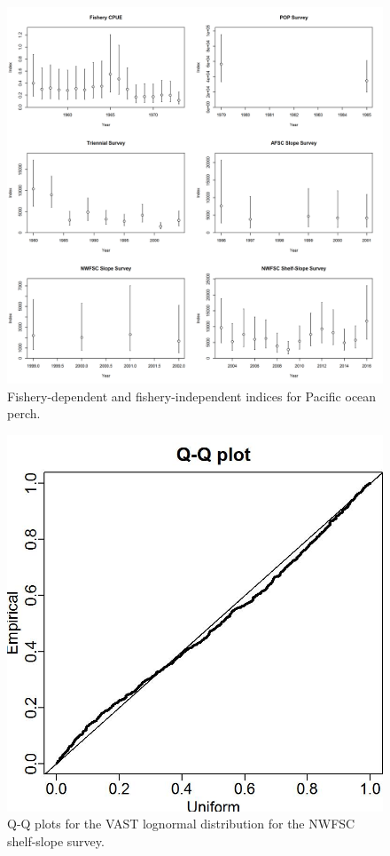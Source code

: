 \documentclass[12pt,]{article}
\begin{document}
\FloatBarrier

\begin{figure}
\centering
\includegraphics{Figures/Index_Data.png}
\caption{Fishery-dependent and fishery-independent indices for Pacific
ocean perch. \label{fig:indices}}
\end{figure}

\FloatBarrier

\begin{figure}
\centering
\includegraphics{Figures/Q-Q_plot_combo.jpg}
\caption{Q-Q plots for the VAST lognormal distribution for the NWFSC
shelf-slope survey. \label{fig:nw_qq}}
\end{figure}
\end{document}
